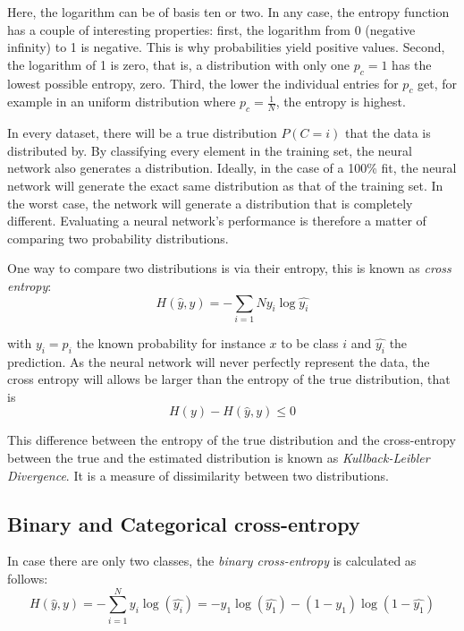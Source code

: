 Here, the logarithm can be of basis ten or two. In any case, the entropy function has a couple of interesting properties: first, the logarithm from 0 (negative infinity) to 1 is negative. This is why probabilities yield positive values. Second, the logarithm of 1 is zero, that is, a distribution with only one $p_c=1$ has the lowest possible entropy, zero. Third, the lower the individual entries for $p_c$ get, for example in an uniform distribution where $p_c=\frac{1}{N}$, the entropy is highest.

In every dataset, there will be a true distribution $P(C=i)$ that the data is distributed by. By classifying every element in the training set, the neural network also generates a distribution. Ideally, in the case of a 100\% fit, the neural network will generate the exact same distribution as that of the training set. In the worst case, the network will generate a distribution that is completely different. Evaluating a neural network's performance is therefore a matter of comparing two probability distributions.

One way to compare two distributions is via their entropy, this is known as \textsl{cross entropy}:
\begin{equation}
H(\hat{y},y)=-\sum_{i=1}{N}y_i\log \hat{y_i}
\end{equation}

with $y_i=p_i$ the known probability for instance $x$ to be class $i$ and $\hat{y_i}$ the prediction. As the neural network will never perfectly represent the data, the cross entropy will allows be larger than the entropy of the true distribution, that is
\begin{equation}
H(y)-H(\hat{y},y) \leq 0
\end{equation}

This difference between the entropy of the true distribution and the cross-entropy between the true and the estimated distribution is known as \textsl{Kullback-Leibler Divergence}. It is a measure of dissimilarity between two distributions.

\subsection{Binary and Categorical cross-entropy}
In  case  there are only two classes, the \textsl{binary cross-entropy} is calculated as follows:
\begin{equation}
H(\hat{y},y)=-\sum_{i=1}^Ny_i\log(\hat{y_i})=-y_1\log(\hat{y_1})-(1-y_1)\log(1-\hat{y_1})
\end{equation}


